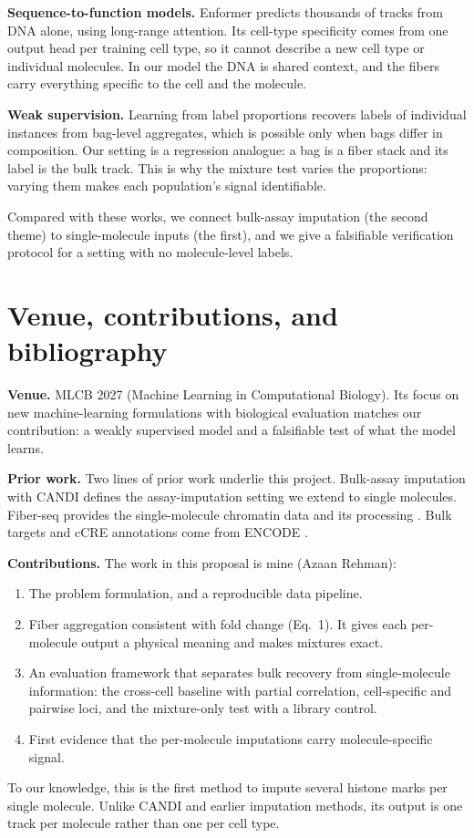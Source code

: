 \documentclass[acmtog,nonacm]{acmart}   %
\begin{document}
\textbf{Sequence-to-function models.} Enformer \citep{Avsec21} predicts thousands of
tracks from DNA alone, using long-range attention. Its cell-type specificity comes from
one output head per training cell type, so it cannot describe a new cell type or individual
molecules. In our model the DNA is shared context, and the fibers carry everything specific
to the cell and the molecule.

\textbf{Weak supervision.} Learning from label proportions \citep{Quadrianto09}
recovers labels of individual instances from bag-level aggregates, which is possible
only when bags differ in composition. Our setting is a regression analogue: a bag is
a fiber stack and its label is the bulk track. This is why the mixture test varies the
proportions: varying them makes each population's signal identifiable.

Compared with these works, we connect bulk-assay imputation (the second theme) to
single-molecule inputs (the first), and we give a falsifiable verification protocol
for a setting with no molecule-level labels.

\section{Venue, contributions, and bibliography}

\textbf{Venue.} MLCB 2027 (Machine Learning in Computational Biology).
Its focus on new machine-learning formulations with biological evaluation
matches our contribution: a weakly supervised model and a falsifiable test of
what the model learns.

\textbf{Prior work.} Two lines of prior work underlie this project. Bulk-assay
imputation with CANDI \citep{Foroozandeh25} defines the assay-imputation setting
we extend to single molecules. Fiber-seq \citep{Stergachis20} provides the
single-molecule chromatin data and its processing \citep{Jha24}. Bulk targets
and cCRE annotations come from ENCODE \citep{ENCODE20}.

\textbf{Contributions.} The work in this proposal is mine (Azaan Rehman):
\begin{enumerate}
  \item The problem formulation, and a reproducible data pipeline.
  \item Fiber aggregation consistent with fold change (Eq.~1). It gives
    each per-molecule output a physical meaning and makes mixtures exact.
  \item An evaluation framework that separates bulk recovery from single-molecule
    information: the cross-cell baseline with partial correlation, cell-specific
    and pairwise loci, and the mixture-only test with a library control.
  \item First evidence that the per-molecule imputations carry molecule-specific signal.
\end{enumerate}
To our knowledge, this is the first method to impute several histone marks
per single molecule. Unlike CANDI and earlier imputation methods, its output
is one track per molecule rather than one per cell type.
\end{document}
